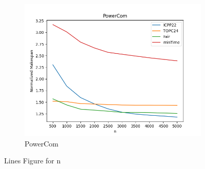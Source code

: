 \documentclass{article}
\begin{document}
\begin{figure}[htbp]
\begin{subfigure}[b]{0.32\textwidth}\includegraphics[width=\textwidth]{Results/n/n_PowerCom}\caption{PowerCom}\label{fig:lines_figures_n_PowerCom}\end{subfigure}
\hfill
\caption{Lines Figure for n}
\label{fig:lines_figures_n}
\end{figure}
\end{document}
